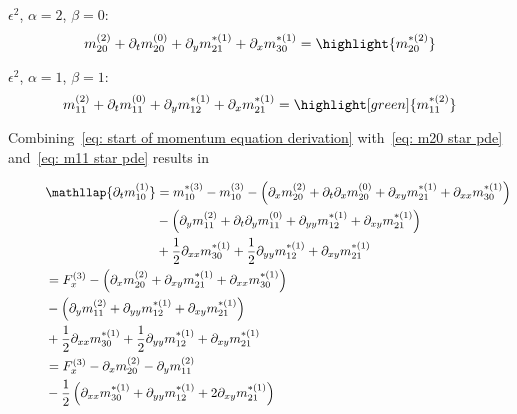 $\epsilon^2$, $\alpha=2$, $\beta=0$:
\begin{equation}
  \label{eq: m20 star pde}
  m_{20}^{(2)} + \partial_t m_{20}^{(0)} + \partial_y m_{21}^{*(1)} + \partial_x m_{30}^{*(1)} = \highlight{m_{20}^{*(2)}}
\end{equation}

$\epsilon^2$, $\alpha=1$, $\beta=1$:
\begin{equation}
  \label{eq: m11 star pde}
  m_{11}^{(2)} + \partial_t m_{11}^{(0)} + \partial_y m_{12}^{*(1)} + \partial_x m_{21}^{*(1)} = \highlight[green]{m_{11}^{*(2)}}
\end{equation}

Combining~\eqref{eq: start of momentum equation derivation} with~\eqref{eq: m20 star pde} and~\eqref{eq: m11 star pde} results in

\begin{align}
  \phantom{\partial_t m_{10}^{(1)}}
  &\begin{aligned}
  \nonumber
    \mathllap{\partial_t m_{10}^{(1)}} & =
    m_{10}^{*(3)} - m_{10}^{(3)}
    - \left(\partial_x m_{20}^{(2)} + \partial_t\partial_x m_{20}^{(0)} + \partial_{xy} m_{21}^{*(1)} + \partial_{xx} m_{30}^{*(1)}\right) \\
    &
    - \left(\partial_y m_{11}^{(2)} + \partial_t\partial_y m_{11}^{(0)} + \partial_{yy} m_{12}^{*(1)} + \partial_{xy} m_{21}^{*(1)}\right) \\
    &
    + \frac{1}{2}\partial_{xx} m_{30}^{*(1)} + \frac{1}{2} \partial_{yy} m_{12}^{*(1)} + \partial_{xy} m_{21}^{*(1)}
  \end{aligned} \\
  &\begin{aligned}
  \nonumber
   & =
    F_x^{(3)}
    - \left(\partial_x m_{20}^{(2)} + \partial_{xy} m_{21}^{*(1)} + \partial_{xx} m_{30}^{*(1)}\right) \\
    &
    - \left(\partial_y m_{11}^{(2)} + \partial_{yy} m_{12}^{*(1)} + \partial_{xy} m_{21}^{*(1)}\right) \\
    &
    + \frac{1}{2}\partial_{xx} m_{30}^{*(1)} + \frac{1}{2} \partial_{yy} m_{12}^{*(1)} + \partial_{xy} m_{21}^{*(1)}
  \end{aligned}\\
%
  &\begin{aligned}
  \nonumber
   & =
    F_x^{(3)}
    - \partial_x m_{20}^{(2)} - \partial_y m_{11}^{(2)}   \\
    &
    - \frac{1}{2} \left(\partial_{xx} m_{30}^{*(1)} + \partial_{yy} m_{12}^{*(1)} + 2\partial_{xy} m_{21}^{*(1)}\right)
  \end{aligned}
\end{align}

